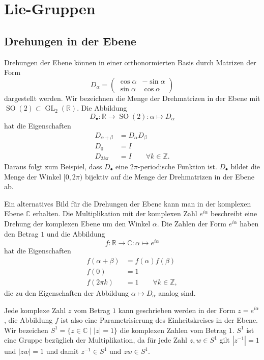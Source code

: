 %
%
%
\section{Lie-Gruppen
\label{buch:section:lie-gruppen}}

\subsection{Drehungen in der Ebene
\label{buch:gruppen:drehungen2d}}
Drehungen der Ebene können in einer orthonormierten Basis durch
Matrizen der Form
\[
D_{\alpha}
=
\begin{pmatrix}
\cos\alpha&-\sin\alpha\\
\sin\alpha& \cos\alpha
\end{pmatrix}
\]
dargestellt werden.
Wir bezeichnen die Menge der Drehmatrizen in der Ebene mit
$\operatorname{SO}(2)\subset\operatorname{GL}_2(\mathbb{R})$.
Die Abbildung
\[
D_{\bullet}
\colon
\mathbb{R}\to \operatorname{SO}(2)
:
\alpha \mapsto D_{\alpha}
\]
hat die Eigenschaften
\begin{align*}
D_{\alpha+\beta}&= D_{\alpha}D_{\beta}
\\
D_0&=I
\\
D_{2k\pi}&=I\qquad \forall k\in\mathbb{Z}.
\end{align*}
Daraus folgt zum Beispiel, dass $D_{\bullet}$ eine $2\pi$-periodische
Funktion ist.
$D_{\bullet}$ bildet die Menge der Winkel $[0,2\pi)$ bijektiv auf
die Menge der Drehmatrizen in der Ebene ab.

Ein alternatives Bild für die Drehungen der Ebene kann man in der komplexen
Ebene $\mathbb{C}$ erhalten.
Die Multiplikation mit der komplexen Zahl $e^{i\alpha}$ beschreibt eine
Drehung der komplexen Ebene um den Winkel $\alpha$.
Die Zahlen der Form $e^{i\alpha}$ haben den Betrag $1$ und die Abbildung
\[
f\colon \mathbb{R}\to \mathbb{C}:\alpha \mapsto e^{i\alpha}
\]
hat die Eigenschaften
\begin{align*}
f(\alpha+\beta) &= f(\alpha)f(\beta)
\\
f(0)&=1
\\
f(2\pi k)&=1\qquad\forall k\in\mathbb{Z},
\end{align*}
die zu den Eigenschaften der Abbildung $\alpha\mapsto D_{\alpha}$ 
analog sind.

Jede komplexe Zahl $z$ vom Betrag $1$ kann geschrieben werden in der Form
$z=e^{i\alpha}$, die Abbildung $f$ ist also eine Parametrisierung des
Einheitskreises in der Ebene.
Wir bezeichen $S^1=\{z\in\mathbb{C}\;|\; |z|=1\}$ die komplexen Zahlen vom
Betrag $1$.
$S^1$ ist eine Gruppe bezüglich der Multiplikation, da für jede Zahl
$z,w\in S^1$ gilt
$|z^{-1}|=1$ und $|zw|=1$ und damit $z^{-1}\in S^1$ und $zw\in S^1$.

